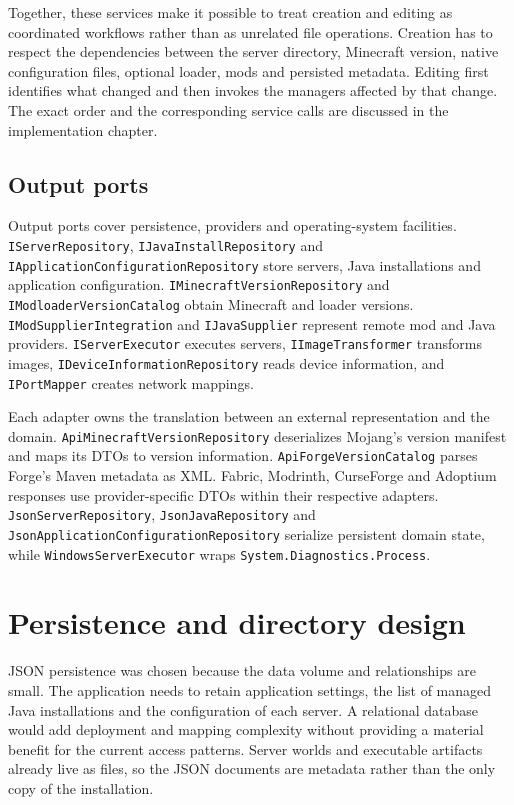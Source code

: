 Together, these services make it possible to treat creation and editing as coordinated workflows rather than as unrelated file operations. Creation has to respect the dependencies between the server directory, Minecraft version, native configuration files, optional loader, mods and persisted metadata. Editing first identifies what changed and then invokes the managers affected by that change. The exact order and the corresponding service calls are discussed in the implementation chapter.

\subsection{Output ports}

Output ports cover persistence, providers and operating-system facilities. \texttt{IServerRepository}, \texttt{IJavaInstallRepository} and \texttt{IApplicationConfigurationRepository} store servers, Java installations and application configuration. \texttt{IMinecraftVersionRepository} and \texttt{IModloaderVersionCatalog} obtain Minecraft and loader versions. \texttt{IModSupplierIntegration} and \texttt{IJavaSupplier} represent remote mod and Java providers. \texttt{IServerExecutor} executes servers, \texttt{IImageTransformer} transforms images, \texttt{IDeviceInformationRepository} reads device information, and \texttt{IPortMapper} creates network mappings.

Each adapter owns the translation between an external representation and the domain. \texttt{ApiMinecraftVersionRepository} deserializes Mojang's version manifest and maps its \acsp{DTO} to version information. \texttt{ApiForgeVersionCatalog} parses Forge's Maven metadata as \acs{XML}. Fabric, Modrinth, CurseForge and Adoptium responses use provider-specific DTOs within their respective adapters. \texttt{JsonServerRepository}, \texttt{JsonJavaRepository} and \texttt{JsonApplicationConfigurationRepository} serialize persistent domain state, while \texttt{WindowsServerExecutor} wraps \texttt{System.Diagnostics.Process}.

\section{Persistence and directory design}

JSON persistence was chosen because the data volume and relationships are small. The application needs to retain application settings, the list of managed Java installations and the configuration of each server. A relational database would add deployment and mapping complexity without providing a material benefit for the current access patterns. Server worlds and executable artifacts already live as files, so the JSON documents are metadata rather than the only copy of the installation.

